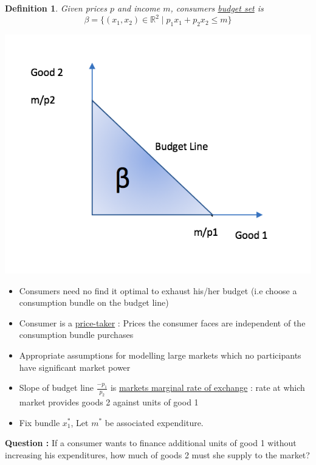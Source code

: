 \documentclass[twoside]{article}
\newtheorem{definition}[theorem]{Definition}
\begin{document}
\begin{definition}
Given prices \(p\) and income \(m\), consumers \underline{budget set} is \[\beta = \{ (x_1, x_2) \in \mathbb{R}^2 \mid p_1 x_1 + p_2 x_2 \leq m \}\]
\end{definition}

\begin{center}
\includegraphics[scale=0.6]{2}
\end{center}

\begin{itemize}
\item Consumers need no find it optimal to exhaust his/her budget (i.e choose a consumption bundle on the budget line) 
\item Consumer is a \underline{price-taker} : Prices the consumer faces are independent of the consumption bundle  purchases
\item Appropriate assumptions for modelling large markets which no participants have significant market power
\item Slope of budget line \(\frac{-p_1}{p_2}\) is \underline{markets marginal rate of exchange} : rate at which market provides goods 2 against units of good 1
\end{itemize}

\begin{itemize}
\item Fix bundle \(x_1^*\), Let \(m^*\) be associated expenditure. 
\end{itemize}

\textbf{Question : } If a consumer wants to finance additional units of good 1 without increasing his expenditures, how much of goods 2 must she supply to the market? 
\end{document}

